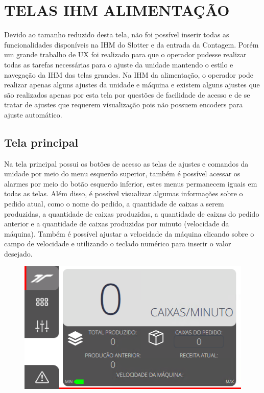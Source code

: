 \thispagestyle{fancy}
\vspace*{40 pt}
\section{\large{\MakeUppercase{Telas IHM alimentação}}}
Devido ao tamanho reduzido desta tela, não foi possível inserir todas as funcionalidades disponíveis na IHM do Slotter e da entrada da Contagem.
 Porém um grande trabalho de UX foi realizado para que o operador pudesse realizar todas as tarefas necessárias para o ajuste da unidade mantendo
 o estilo e navegação da IHM das telas grandes. Na IHM da alimentação, o operador pode realizar apenas alguns ajustes da unidade e máquina e existem
 alguns ajustes que são realizados apenas por esta tela por questões de facilidade de acesso e de se tratar de ajustes que requerem visualização pois
 não possuem encoders para ajuste automático.
 
\subsection{\small{Tela principal}}\label{ihmAlimentacaoTelaPrincipal}

Na tela principal possui os botões de acesso as telas de ajustes e comandos da unidade por meio do menu esquerdo superior, também é possível acessar
os alarmes por meio do botão esquerdo inferior, estes menus permanecem iguais em todas as telas. Além disso, é possível visualizar algumas informações 
sobre o pedido atual, como o nome do pedido, a quantidade de caixas a serem produzidas, a quantidade de caixas produzidas, a quantidade de caixas
do pedido anterior e a quantidade de caixas produzidas por minuto (velocidade da máquina). Também é possível ajustar a velocidade da máquina clicando
sobre o campo de velocidade e utilizando o teclado numérico para inserir o valor desejado.

\vspace*{\fill}
\begin{figure}[h]
  \centering
  \includegraphics{src/imagesFlexo/11-IHMALM/e-1.png}
\end{figure}
\vspace*{\fill}

